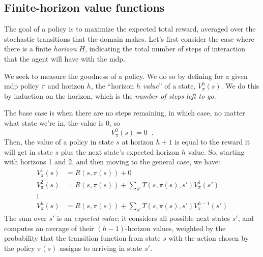 \subsection{Finite-horizon value functions}
\label{sec-mdp_finite_horizon}

The goal of a policy is to maximize the expected total reward, averaged over
the stochastic transitions that the domain makes.  Let's first
consider the case where there is a finite {\em horizon} $H$,
indicating the total number of steps of interaction that the agent
will have with the {\sc mdp}.

We seek to measure the goodness of a
policy. We do so by defining for a given {\sc mdp} policy $\pi$ and horizon
$h$, the ``horizon $h$ {\em value}'' of a state, $V^{h}_\pi(s)$.  We
do this by induction on the horizon, which is the {\em number of steps
    left to go}.

The base case is when there are no steps remaining, in which case, no
matter what state we're in, the value is 0,  so
\begin{equation}
  V^0_{\pi}(s) = 0\;\;.
  \label{eq:finite_val_0}
\end{equation}
Then, the value of a policy in state $s$ at horizon $h + 1$ is equal
to the reward it will get in state $s$ plus the next state's expected horizon $h$
value.  So, starting with horizons 1 and 2, and then
moving to the general case, we have:
\begin{align}
  V^1_{\pi}(s) & = R(s, \pi(s)) + 0                                              \\
  \label{eq:finite_val_1}
  V^2_{\pi}(s) & = R(s, \pi(s)) + \sum_{s'}T(s, \pi(s), s')  V^1_{\pi}(s')       \\
  \vdots
  \nonumber                                                                      \\
  V^h_{\pi}(s) & = R(s, \pi(s)) + \sum_{s'}T(s, \pi(s), s')  V^{h - 1}_{\pi}(s')
  \label{eq:finite_value}
\end{align}
The sum over $s'$ is an {\em expected value}: it
considers all possible next states $s'$, and computes an average of
their $(h-1)$-horizon values, weighted by the probability that the
transition function from state $s$ with the action chosen by the
policy $\pi(s)$ assigns to arriving in state $s'$.

